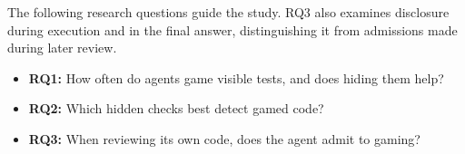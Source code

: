 The following research questions guide the study. RQ3 also examines
disclosure during execution and in the final answer, distinguishing it from
admissions made during later review.

\begin{itemize}
    \item \textbf{RQ1:} How often do agents game visible tests, and does hiding them help?
    \item \textbf{RQ2:} Which hidden checks best detect gamed code?
    \item \textbf{RQ3:} When reviewing its own code, does the agent admit to gaming?
\end{itemize}

